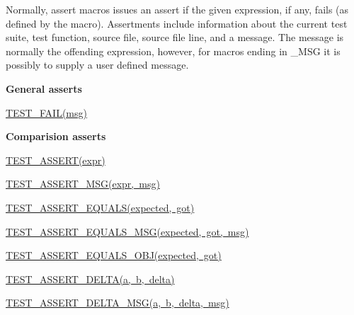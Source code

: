 Normally, assert macros issues an assert if the given expression, if any, fails (as defined by the macro). Assertments include information about the current test suite, test function, source file, source file line, and a message. The message is normally the offending expression, however, for macros ending in \+\_\+\+M\+SG it is possibly to supply a user defined message.

{\bfseries General asserts}
\begin{DoxyItemize}
\item \mbox{\hyperlink{cpptest-assert_8h_a947ab44cc42369eb7cfe33f8a1e38e4b}{T\+E\+S\+T\+\_\+\+F\+A\+I\+L(msg)}}
\end{DoxyItemize}

{\bfseries Comparision asserts}
\begin{DoxyItemize}
\item \mbox{\hyperlink{cpptest-assert_8h_a29a763f14098f5574ae5c68291dc6ddd}{T\+E\+S\+T\+\_\+\+A\+S\+S\+E\+R\+T(expr)}}
\item \mbox{\hyperlink{cpptest-assert_8h_ac612ede938734f9c8d898e05818882fb}{T\+E\+S\+T\+\_\+\+A\+S\+S\+E\+R\+T\+\_\+\+M\+S\+G(expr, msg)}}
\item \mbox{\hyperlink{cpptest-assert_8h_ae281f4d973e657b11691a97551f17dd1}{T\+E\+S\+T\+\_\+\+A\+S\+S\+E\+R\+T\+\_\+\+E\+Q\+U\+A\+L\+S(expected, got)}}
\item \mbox{\hyperlink{cpptest-assert_8h_ab8e9ce729f96abe74b76d98f9568a59c}{T\+E\+S\+T\+\_\+\+A\+S\+S\+E\+R\+T\+\_\+\+E\+Q\+U\+A\+L\+S\+\_\+\+M\+S\+G(expected, got, msg)}}
\item \mbox{\hyperlink{cpptest-assert_8h_aa506d98e8a5fc575df0361906f7deef8}{T\+E\+S\+T\+\_\+\+A\+S\+S\+E\+R\+T\+\_\+\+E\+Q\+U\+A\+L\+S\+\_\+\+O\+B\+J(expected, got)}}
\item \mbox{\hyperlink{cpptest-assert_8h_a9583b1709f4b9dfb3ff2849bfec5c885}{T\+E\+S\+T\+\_\+\+A\+S\+S\+E\+R\+T\+\_\+\+D\+E\+L\+T\+A(a, b, delta)}}
\item \mbox{\hyperlink{cpptest-assert_8h_afcd749452840bfde9be575ef22fcede0}{T\+E\+S\+T\+\_\+\+A\+S\+S\+E\+R\+T\+\_\+\+D\+E\+L\+T\+A\+\_\+\+M\+S\+G(a, b, delta, msg)}}
\end{DoxyItemize}

